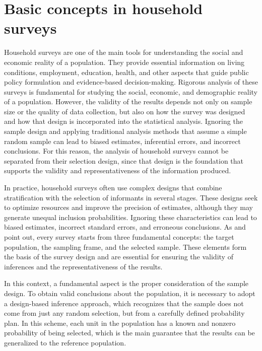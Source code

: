 \documentclass[
  english,
  12pt,
]{book}
\begin{document}
\chapter{Basic concepts in household surveys}\label{cap2}

Household surveys are one of the main tools for understanding the social and economic reality of a population. They provide essential information on living conditions, employment, education, health, and other aspects that guide public policy formulation and evidence-based decision-making. Rigorous analysis of these surveys is fundamental for studying the social, economic, and demographic reality of a population. However, the validity of the results depends not only on sample size or the quality of data collection, but also on how the survey was designed and how that design is incorporated into the statistical analysis. Ignoring the sample design and applying traditional analysis methods that assume a simple random sample can lead to biased estimates, inferential errors, and incorrect conclusions. For this reason, the analysis of household surveys cannot be separated from their selection design, since that design is the foundation that supports the validity and representativeness of the information produced.

In practice, household surveys often use complex designs that combine stratification with the selection of informants in several stages. These designs seek to optimize resources and improve the precision of estimates, although they may generate unequal inclusion probabilities. Ignoring these characteristics can lead to biased estimates, incorrect standard errors, and erroneous conclusions. As \citet{sarndal2003model} and \citet{Gutierrez2016} point out, every survey starts from three fundamental concepts: the target population, the sampling frame, and the selected sample. These elements form the basis of the survey design and are essential for ensuring the validity of inferences and the representativeness of the results.

In this context, a fundamental aspect is the proper consideration of the sample design. To obtain valid conclusions about the population, it is necessary to adopt a design-based inference approach, which recognizes that the sample does not come from just any random selection, but from a carefully defined probability plan. In this scheme, each unit in the population has a known and nonzero probability of being selected, which is the main guarantee that the results can be generalized to the reference population.
\end{document}

